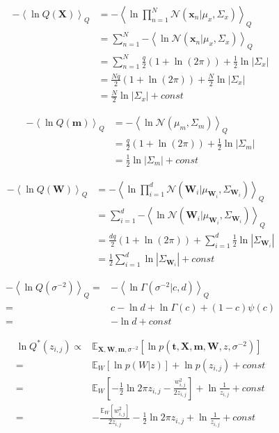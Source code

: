 \documentclass[10pt]{article}
\newcommand{\Angle}[1]{\left \langle #1 \right \rangle}
\newcommand{\Eq}[1]{\Angle{#1}_Q}
\newcommand{\N}[2][]{\mathcal{N} \left( #1,#2 \right)}
\newcommand{\Det}[1]{\left| #1 \right|}
\begin{document}
	\begin{align}
		-\Eq{\ln{Q(\bm{X})}}&=-\Eq{\ln{\prod_{n=1}^N{\N[\bm{x}_n \vert \mu_x]{\Sigma_x}}}} \\
		&=\sum_{n=1}^N{-\Eq{\ln{\N[\bm{x}_n \vert \mu_x]{\Sigma_x}}}} \\
		&=\sum_{n=1}^N{\frac{q}{2}(1+\ln(2\pi)) + \frac{1}{2}\ln{\Det{\Sigma_x}}} \\
		&=\frac{Nq}{2}( 1+\ln(2\pi)) + \frac{N}{2}\ln{\Det{\Sigma_x}} \\
		&=\frac{N}{2}\ln{\Det{\Sigma_x}} + const
	\end{align}
	
	\begin{align}
		-\Eq{\ln{Q(\bm{m})}}&=-\Eq{\ln{\N[\mu_m]{\Sigma_m}}} \\
		&=\frac{q}{2}( 1+\ln(2\pi)) + \frac{1}{2}\ln{\Det{\Sigma_m}} \\
		&=\frac{1}{2}\ln{\Det{\Sigma_m}} + const
	\end{align}

	\begin{align}
		-\Eq{\ln{Q(\bm{W})}}&=-\Eq{\ln{\prod_{i=1}^d{\N[\bm{W}_i \vert \mu_{\bm{W}_i}]{\Sigma_{\bm{W}_i}}}}} \\
		&=\sum_{i=1}^d{-\Eq{\ln{\N[{\bm{W}_i} \vert \mu_{\bm{W}_i}]{\Sigma_{\bm{W}_i}}}}} \\
		&=\frac{dq}{2}(1+\ln(2\pi)) + \sum_{i=1}^d{\frac{1}{2}\ln{\Det{\Sigma_{\bm{W}_i}}}} \\
		&=\frac{1}{2}\sum_{i=1}^d{\ln{\Det{\Sigma_{\bm{W}_i}}}} + const
	\end{align}
	
	\begin{align}
		-\Eq{\ln{Q(\sigma^{-2})}}=&-\Eq{\ln{\Gamma(\sigma^{-2} \vert c,d)}} \\
		=&c-\ln{d}+\ln{\Gamma(c)}+(1-c)\psi(c) \\
		=&-\ln{d} + const
	\end{align}
	
	\begin{align}
		\ln{Q^*(z_{i,j})} \propto &\mathbb{E}_{\bm{X},\bm{W},\bm{m},\sigma^{-2}}\left[\ln{p(\bm{t},\bm{X},\bm{m},\bm{W},z,\sigma^{-2})} \right] \\
		=&\mathbb{E}_{W} \left[ \ln{p(W \vert z)} \right] + \ln{p(z_{i,j})} + const \\
		=&\mathbb{E}_{W} \left[ -\frac{1}{2}\ln{2\pi z_{i,j}} - \frac{w_{i,j}^2}{2z_{i,j}} \right] + \ln{\frac{1}{z_{i,j}}} + const \\
		=& -\frac{ \mathbb{E}_{W} \left[ w_{i,j}^2 \right] }{2z_{i,j}} -\frac{1}{2}\ln{2\pi z_{i,j}} + \ln{\frac{1}{z_{i,j}}} + const \\
	\end{align}	
	
\end{document}
